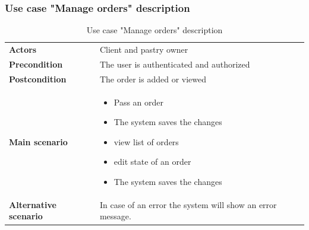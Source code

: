 \documentclass[12pt,a4paper]{report}
\begin{document}
		\subsubsection*{Use case "Manage orders" description}
		\begin{table}[H]
			\begin{center}
				\captionsetup[table]{skip=10pt}
				\caption{Use case "Manage orders" description}
				\setlength\doublerulesep{0.5pt}
				\begin{tabular}{|  p{5cm}|  p{9cm}|}
					\rowcolor{LightCyan}
					
					\hline
					\multicolumn{2}{c}{Use case "Manage orders"}\\
					\hline
					
					\textbf{Actors} &                        
					Client and pastry owner
					\\ \hline
					
					\textbf{Precondition} &                        
					The user is authenticated and authorized
					\\ \hline
					\textbf{Postcondition} &                        
					The order is added or viewed
					\\ \hline
					
					\textbf{Main scenario} &                   
					\begin{itemize}
						\item Pass an order
						\item The system saves the changes
						\item view list of orders
						\item edit state of an order
						\item The system saves the changes
						
					\end{itemize}
					
					
					\\ \hline
					
					\textbf{Alternative scenario} &                        
					In case of an error the system will show an error message.
					\\ \hline
					
					
				\end{tabular}
				
			\end{center}
			
		\end{table}
\end{document}
